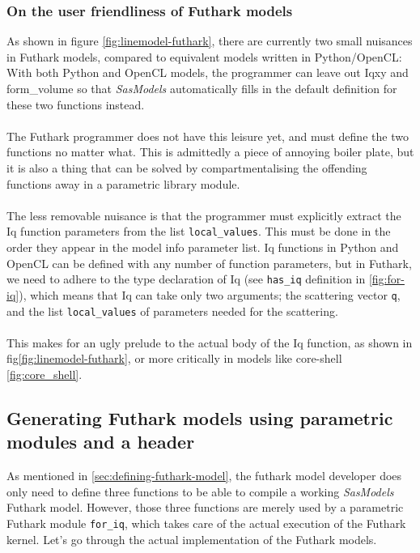 \documentclass[11pt]{article}
\newcommand{\sasmodels}{\textit{SasModels}}
\newcommand{\foriq}{\texttt{for\_iq}}
\begin{document}
\subsubsection{On the user friendliness of Futhark models}
As shown in figure \ref{fig:linemodel-futhark}, there are currently two small 
nuisances in Futhark models, compared to equivalent models written in
Python/OpenCL:
\\
With both Python and OpenCL models, the programmer can leave out Iqxy and 
form\_volume so that \sasmodels{} automatically fills in the default definition
for these two functions instead.
\\\\
The Futhark programmer does not have this leisure yet, and must define the two
functions no matter what. This is admittedly a piece of annoying boiler plate,
but it is also a thing that can be solved by compartmentalising the offending
functions away in a parametric library module.
\\\\
The less removable nuisance is that the programmer must explicitly extract the
Iq function parameters from the list \texttt{local\_values}. This must be done
in the order they appear in the model info parameter list.
Iq functions in Python and OpenCL can be defined with any number of function 
parameters, but in Futhark, we need to adhere to the type declaration of Iq 
(see \texttt{has\_iq} definition in \ref{fig:for-iq}), which means that Iq can 
take only two arguments; the scattering vector \texttt{q}, and the list 
\texttt{local\_values} of parameters needed for the scattering.
\\\\
This makes for an ugly prelude to the actual body of the Iq function, as shown
in fig\ref{fig:linemodel-futhark}, or more critically in models like 
core-shell \ref{fig:core_shell}.

\subsection{Generating Futhark models using parametric modules and a header}
\label{sec:generating-futhark}
As mentioned in \ref{sec:defining-futhark-model}, the futhark model developer
does only need to define three functions to be able to compile a working 
\sasmodels{} Futhark model.
However, those three functions are merely used by a parametric Futhark module 
\foriq{}, which takes care of the actual execution of the 
Futhark kernel.
Let's go through the actual implementation of the Futhark models.
\end{document}
